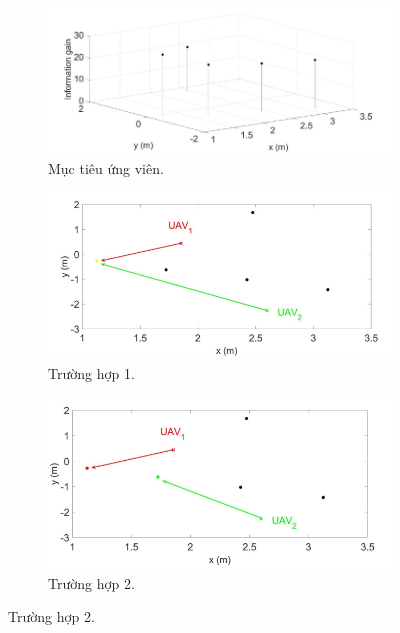 \documentclass[11pt,openany]{book}
\begin{document}
\begin{algorimth}[H]
\begin{figure}[H]
    \centering
    \begin{subfigure}[H]{0.6\linewidth}
        \includegraphics[chiều rộng=\linewidth]{assets/3_17_a.png}
        \caption{{Mục tiêu ứng viên.}}
        \label{fig:3.17a}
    \end{subfigure}
    \begin{subfigure}[H]{0.6\linewidth}
        \includegraphics[chiều rộng=\linewidth]{assets/3_17_b.png}
        \caption{{Trường hợp 1.}}
        \label{fig:3.17b}
    \end{subfigure}
    \begin{subfigure}[H]{0.6\linewidth}
        \includegraphics[chiều rộng=\linewidth]{assets/3_17_c.png}
        \caption{{Trường hợp 2.}}

\end{subfigure}
\end{figure}
\end{algorimth}
\end{document}
